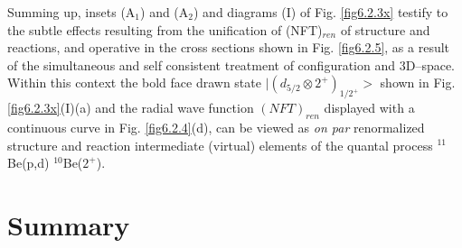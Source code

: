    
   Summing up, insets 
   (A$_1$) and (A$_2$)  and diagrams (I) of Fig. \ref{fig6.2.3x} testify to the subtle effects resulting  from the unification of (NFT)$_{ren}$ of structure 
   and reactions, and operative in the cross sections shown in Fig. \ref{fig6.2.5}, as a result of the 
   simultaneous and self consistent treatment of configuration and 3D--space.  Within this context
   the bold face drawn state $| (d_{5/2} \otimes 2^+)_{1/2^+}>$ shown in Fig. \ref{fig6.2.3x}(I)(a) 
   and the radial  wave function $(NFT)_{ren}$ displayed with a continuous curve in Fig. \ref{fig6.2.4}(d), can be viewed as {\it on par} renormalized structure and reaction 
   intermediate (virtual) elements of the quantal process $^{11}$Be(p,d) $^{10}$Be($2^+$).
   
   
\section{Summary}
